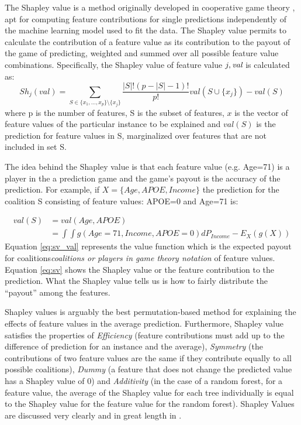 \documentclass[preprint,12pt]{elsarticle}
\begin{document}
The Shapley value is a method originally developed in cooperative game theory \cite{gura2008insights}, apt for computing feature contributions for single predictions independently of the machine learning model used to fit the data. The Shapley value permits to calculate the contribution of a feature value as its contribution to the payout of the game of predicting, weighted and summed over all possible feature value combinations.
Specifically, the Shapley value of feature value $j, \emph{val}$ is calculated as:
\begin{equation}
Sh_j(val) = \sum_{S \in \{x_1,...,x_p\} \setminus \{x_j\} } \frac{|S|!(p-|S|-1)!}{p!} val(S \cup \{x_j\}) -val(S)
\label{eq:sv}
\end{equation}
where p is the number of features, S is the subset of features, $x$ is the vector of feature values of the particular instance to be explained and $val(S)$ is the prediction for feature values in S, marginalized over features that are not included in set S. 

The idea behind the Shapley value is that each feature value (e.g. Age=71) is a player in the a prediction game and the game's payout is the accuracy of the prediction. For example, if $X=\{Age, APOE, Income\}$ the prediction for the coalition S consisting of feature values: APOE=0 and Age=71 is:

\begin{equation}\label{eq:sv_val}
\begin{split}
 val(S) & = val(Age, APOE) \\ 
& =  \int \int g(Age=71, Income, APOE=0)dP_{Income} - E_X(g(X))
\end{split}
\end{equation}
Equation \ref{eq:sv_val} represents the value function which is the expected payout for coalitions\emph{coalitions or players in game theory notation} of feature values.
Equation \ref{eq:sv} shows the Shapley value or the feature contribution to the prediction. What the Shapley value tells us is how to fairly distribute the “payout” among the features. 

Shapley values is arguably the best permutation-based method for explaining the effects of feature values in the average prediction. Furthermore, Shapley value satisfies the properties of \emph{Efficiency} (feature contributions must add up to the difference of prediction for an instance and the average), \emph{Symmetry} (the contributions of two feature values are the same if they contribute equally to all possible coalitions), \emph{Dummy} (a feature that does not change the predicted value has a Shapley value of 0) and \emph{Additivity} (in the case of a random forest, for a feature value, the average of the Shapley value for each tree individually is equal to the Shapley value for the feature value for the random forest). Shapley Values are discussed very clearly and in great length in \cite{molnar2018interpretable}.
\end{document}

